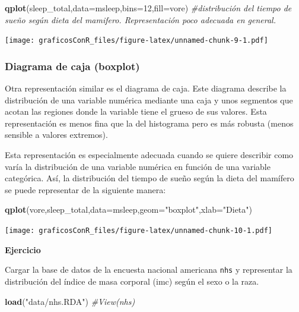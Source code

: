 \documentclass[]{article}
\newenvironment{Shaded}{\begin{snugshade}}{\end{snugshade}}
\newcommand{\CommentTok}[1]{\textcolor[rgb]{0.56,0.35,0.01}{\textit{#1}}}
\newcommand{\DataTypeTok}[1]{\textcolor[rgb]{0.13,0.29,0.53}{#1}}
\newcommand{\DecValTok}[1]{\textcolor[rgb]{0.00,0.00,0.81}{#1}}
\newcommand{\KeywordTok}[1]{\textcolor[rgb]{0.13,0.29,0.53}{\textbf{#1}}}
\newcommand{\NormalTok}[1]{#1}
\newcommand{\StringTok}[1]{\textcolor[rgb]{0.31,0.60,0.02}{#1}}
\newcounter{ejcnt}[section]
\numberwithin{ejcnt}{section}
\newenvironment{ej}[1][]{%
	\refstepcounter{ejcnt}%
	\par\medskip%
	\noindent%
	\textbf{Ejercicio \theejcnt \;\;}%
	\rmfamily%
}{\medskip}
\begin{document}
\begin{Shaded}
\begin{Highlighting}[]
\KeywordTok{qplot}\NormalTok{(sleep_total,}\DataTypeTok{data=}\NormalTok{msleep,}\DataTypeTok{bins=}\DecValTok{12}\NormalTok{,}\DataTypeTok{fill=}\NormalTok{vore) }\CommentTok{#distribución del tiempo de sueño según dieta del mamifero. Representación poco adecuada en general.}
\end{Highlighting}
\end{Shaded}

\texttt{[image: graficosConR\_files/figure-latex/unnamed-chunk-9-1.pdf]}

\hypertarget{diagrama-de-caja-boxplot}{%
\subsubsection{Diagrama de caja (boxplot)}\label{diagrama-de-caja-boxplot}}

Otra representación similar es el diagrama de caja. Este diagrama describe la distribución de una variable numérica mediante una caja y unos segmentos que acotan las regiones donde la variable tiene el grueso de sus valores. Esta representación es menos fina que la del histograma pero es más robusta (menos sensible a valores extremos).

Esta representación es especialmente adecuada cuando se quiere describir como varía la distribución de una variable numérica en función de una variable categórica. Así, la distribución del tiempo de sueño según la dieta del mamífero se puede representar de la siguiente manera:

\begin{Shaded}
\begin{Highlighting}[]
\KeywordTok{qplot}\NormalTok{(vore,sleep_total,}\DataTypeTok{data=}\NormalTok{msleep,}\DataTypeTok{geom=}\StringTok{"boxplot"}\NormalTok{,}\DataTypeTok{xlab=}\StringTok{"Dieta"}\NormalTok{)}
\end{Highlighting}
\end{Shaded}

\texttt{[image: graficosConR\_files/figure-latex/unnamed-chunk-10-1.pdf]}

\begin{ej}
Cargar la base de datos de la encuesta nacional americana \texttt{nhs} y
representar la distribución del índice de masa corporal (imc) según el
sexo o la raza.
\end{ej}

\begin{Shaded}
\begin{Highlighting}[]
\KeywordTok{load}\NormalTok{(}\StringTok{"data/nhs.RDA"}\NormalTok{)}
\CommentTok{#View(nhs)}
\end{Highlighting}
\end{Shaded}
\end{document}
